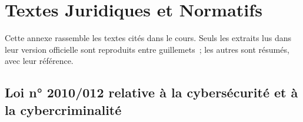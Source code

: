 
\chapter{Textes Juridiques et Normatifs}
\label{ann:lois}

Cette annexe rassemble les textes cités dans le cours. Seuls les extraits lus
dans leur version officielle sont reproduits entre guillemets~; les autres sont
résumés, avec leur référence.

\section*{Loi n° 2010/012 relative à la cybersécurité et à la cybercriminalité}

